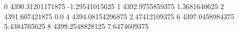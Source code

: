 0 4390.31201171875 -1.29541015625
1 4392.9755859375 1.3681640625
2 4391.607421875 0.0
4 4394.08154296875 2.47412109375
6 4397.0458984375 5.4384765625
8 4399.2548828125 7.6474609375
